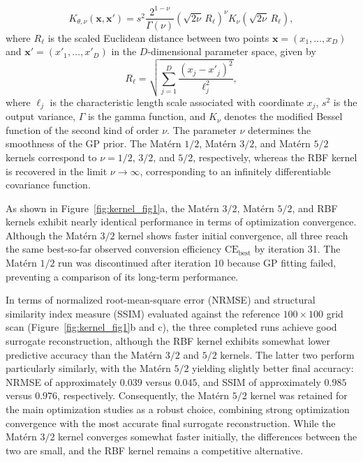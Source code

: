 \documentclass[11pt,a4paper]{article}
\begin{document}
\begin{equation}
K_{\theta,\nu}(\mathbf{x},\mathbf{x}')
=s^2\frac{2^{1-\nu}}{\Gamma(\nu)}
\left(\sqrt{2\nu}\,R_{\boldsymbol{\ell}}\right)^\nu
K_\nu\!\left(\sqrt{2\nu}\,R_{\boldsymbol{\ell}}\right),
\label{eq:general_matern}
\end{equation}
where $R_{\boldsymbol{\ell}}$ is the scaled Euclidean distance between two points $\mathbf{x}=(x_1,\ldots,x_D)$ and $\mathbf{x'}=(x'_1,\ldots,x'_D)$ in the $D$-dimensional parameter space, given by
\begin{equation}
R_{\boldsymbol{\ell}}
=\sqrt{\sum_{j=1}^{D}\frac{(x_j-x'_j)^2}{\ell_j^2}},
\label{eq:matern_distance}
\end{equation}
where $\ell_j$ is the characteristic length scale associated with coordinate $x_j$, $s^2$ is the output variance, $\Gamma$ is the gamma function, and $K_\nu$ denotes the modified Bessel function of the second kind of order $\nu$. The parameter $\nu$ determines the smoothness of the GP prior. The Mat\'ern $1/2$, Mat\'ern $3/2$, and Mat\'ern $5/2$ kernels correspond to $\nu=1/2$, $3/2$, and $5/2$, respectively, whereas the RBF kernel is recovered in the limit $\nu\to\infty$, corresponding to an infinitely differentiable covariance function.

As shown in Figure~\ref{fig:kernel_fig1}a, the Mat\'ern $3/2$, Mat\'ern $5/2$, and RBF kernels exhibit nearly identical performance in terms of optimization convergence. Although the Mat\'ern $3/2$ kernel shows faster initial convergence, all three reach the same best-so-far observed conversion efficiency $\mathrm{CE}_{\mathrm{best}}$ by iteration 31. The Mat\'ern $1/2$ run was discontinued after iteration 10 because GP fitting failed, preventing a comparison of its long-term performance.

In terms of normalized root-mean-square error (NRMSE) and structural similarity index measure (SSIM) evaluated against the reference $100\times100$ grid scan (Figure~\ref{fig:kernel_fig1}b and c), the three completed runs achieve good surrogate reconstruction, although the RBF kernel exhibits somewhat lower predictive accuracy than the Mat\'ern $3/2$ and $5/2$ kernels. The latter two perform particularly similarly, with the Mat\'ern $5/2$ yielding slightly better final accuracy: NRMSE of approximately $0.039$ versus $0.045$, and SSIM of approximately $0.985$ versus $0.976$, respectively.
Consequently, the Mat\'ern $5/2$ kernel was retained for the main optimization studies as a robust choice, combining strong optimization convergence with the most accurate final surrogate reconstruction. While the Mat\'ern $3/2$ kernel converges somewhat faster initially, the differences between the two are small, and the RBF kernel remains a competitive alternative.
\end{document}
